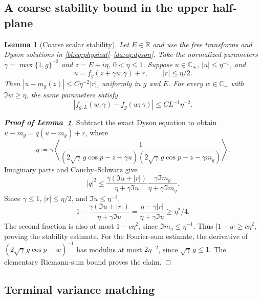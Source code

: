 \documentclass[11pt]{article}
\numberwithin{equation}{section}
\newtheorem{lemma}[theorem]{Lemma}
\theoremstyle{remark}
\newcommand{\C}{\mathbb C}
\newcommand{\R}{\mathbb R}
\begin{document}
\subsection{A coarse stability bound in the upper half-plane}
\label{app:rough-stability}

\begin{lemma}[Coarse scalar stability]\label{da:lem:rough-stability}
Let $E\in\R$ and use the free transforms and
Dyson solutions in \eqref{bl:eq:physical}--\eqref{da:eq:dyson}.
Take the normalized parameters $\gamma=\max\{1,g\}^{-2}$ and
$z=E+i\eta$, $0<\eta\le1$. Suppose $u\in\C_+$, $|u|\le\eta^{-1}$,
and
\[
 u=f_g(z+\gamma u;\gamma)+r,\qquad |r|\le\eta/2.
\]
Then $|u-m_g(z)|\le C\eta^{-2}|r|$, uniformly in $g$ and $E$.
For every $w\in\C_+$ with $\Im w\ge\eta$, the same parameters satisfy
\[
 |f_{g,L}(w;\gamma)-f_g(w;\gamma)|\le CL^{-1}\eta^{-2}.
\]
\end{lemma}

\begin{proof}[\textbf{Proof of Lemma~\ref{da:lem:rough-stability}}]
Subtract the exact Dyson equation to obtain
$u-m_g=q(u-m_g)+r$, where
\[
 q\coloneqq \gamma\left\langle
 \frac1{(2\sqrt\gamma\,g\cos p-z-\gamma u)
          (2\sqrt\gamma\,g\cos p-z-\gamma m_g)}\right\rangle.
\]
Imaginary parts and Cauchy--Schwarz give
\[
 |q|^2\le
 \frac{\gamma(\Im u+|r|)}{\eta+\gamma\Im u}
 \frac{\gamma\Im m_g}{\eta+\gamma\Im m_g}.
\]
Since $\gamma\le1$, $|r|\le\eta/2$, and $\Im u\le\eta^{-1}$,
\[
 1-\frac{\gamma(\Im u+|r|)}{\eta+\gamma\Im u}
 =\frac{\eta-\gamma|r|}{\eta+\gamma\Im u}\ge\eta^2/4.
\]
The second fraction is also at most $1-c\eta^2$, since
$\Im m_g\le\eta^{-1}$. Thus $|1-q|\ge c\eta^2$, proving the stability estimate. For the Fourier-sum estimate,
the derivative of $(2\sqrt\gamma\,g\cos p-w)^{-1}$ has modulus
at most $2\eta^{-2}$, since $\sqrt\gamma\,g\le1$.
The elementary Riemann-sum bound proves the claim.
\end{proof}

\subsection{Terminal variance matching}\label{app:terminal-matching}
\end{document}
